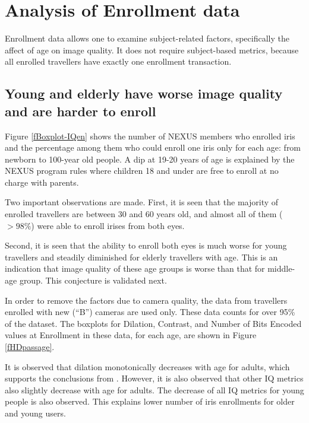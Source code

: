 \documentclass{cta-author}%
\begin{document}
\section{Analysis of Enrollment data}
\label{s.resultsEN}

Enrollment data allows one to examine subject-related factors, specifically the affect of age on image quality.
It does not require subject-based metrics, because all enrolled travellers have exactly one enrollment transaction.




\subsection{Young and elderly have worse image quality and are harder to enroll}
\label{s.IQ-EN-age}

Figure \ref{fBoxplot-IQen} %
shows the number of NEXUS members who enrolled iris and the percentage among them who could enroll one iris only for each age:
from newborn to 100-year old people.
A dip at  19-20 years of age is explained by the NEXUS program rules where children 18 and under are free to enroll at no charge with parents. 



Two important observations are made. 
First, it is seen that the majority of enrolled travellers are between 30 and 60 years old, 
and almost all of them ($>98\%$) were able to enroll irises from both eyes.

Second, it is seen that 
the ability to enroll both eyes is much worse for young travellers and steadily diminished for  elderly travellers with age. 
This is an indication that image quality of these age groups  is worse than that for middle-age group.
This conjecture is  validated next. 

In order to remove the factors due to camera quality, the data from travellers enrolled with new  (``B'') cameras are used only.
These data counts for over 95\% of the dataset.
The boxplots for Dilation, Contrast, and Number of Bits Encoded values at Enrollment in these data, for each age, 
are shown in Figure \ref{fHDpassage}.

It is observed that dilation monotonically decreases with age for adults, 
which supports the conclusions from \cite{irexVI}.
However, it is also observed that other IQ metrics also slightly decrease with age for adults.
The decrease of all IQ metrics for young people is also observed. 
This explains lower number of iris enrollments for older and young users.
\end{document}
